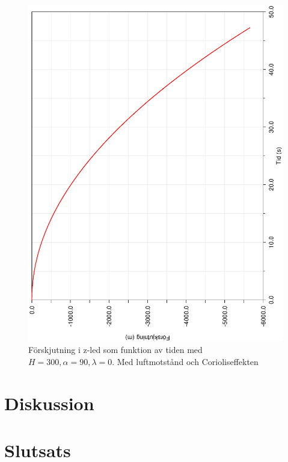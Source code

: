 \documentclass[a4paper]{article}
\begin{document}
\begin{figure}[h!]
	\centering
	\includegraphics[width=0.5\linewidth, angle=-90]{Data/ZdisplacementAlpha90Lambda0.eps}
	\caption{Förskjutning i z-led som funktion av tiden med $H = 300, \alpha = 90, \lambda = 0$. Med luftmotstånd och Corioliseffekten}
	\label{fig:ZAlpha90Lambda0}
\end{figure}

\section{Diskussion}

\section{Slutsats}
\end{document}
